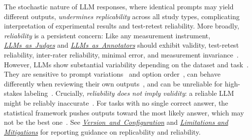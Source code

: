 \documentclass[smallextended]{svjour3}
\newcommand{\annotators}{\hyperref[sec:llms-as-annotators]{\mbox{\emph{LLMs as Annotators}}}\xspace}
\newcommand{\judges}{\hyperref[sec:llms-as-judges]{\mbox{\emph{LLMs as Judges}}}\xspace}
\newcommand{\annotators}{\href{/study-types/annotators/}{\emph{LLMs as Annotators}}\xspace}
\newcommand{\judges}{\href{/study-types/judges/}{\emph{LLMs as Judges}}\xspace}
\newcommand{\modelversion}{\hyperref[sec:report-model-version-configuration-and-customizations]{\mbox{\emph{Version and Configuration}}}\xspace}
\newcommand{\limitationsmitigations}{\hyperref[sec:report-limitations-and-mitigations]{\emph{Limitations and Mitigations}}\xspace}
\newcommand{\modelversion}{\href{/guidelines/model-version/}{\emph{Version and Configuration}}\xspace}
\newcommand{\limitationsmitigations}{\href{/guidelines/limitations/}{\emph{Limitations and Mitigations}}\xspace}
\begin{document}
The stochastic nature of LLM responses, where identical prompts may yield different outputs, \emph{undermines replicability} across all study types, complicating interpretation of experimental results and test-retest reliability. More broadly, \emph{reliability} is a persistent concern: Like any measurement instrument, \judges and \annotators should exhibit validity, test-retest reliability, inter-rater reliability, minimal error, and measurement invariance~\cite{DBLP:books/sp/24/RalphKAA24}. However, LLMs show substantial variability depending on the dataset and task~\cite{DBLP:journals/corr/abs-2306-00176, DBLP:journals/corr/abs-2406-18403}. They are sensitive to prompt variations~\cite{DBLP:journals/corr/abs-2304-11085} and option order~\cite{DBLP:conf/naacl/PezeshkpourH24}, can behave differently when reviewing their own outputs~\cite{DBLP:conf/nips/PanicksseryBF24}, and can be unreliable for high-stakes labeling~\cite{DBLP:conf/chi/Wang0RMM24}. Crucially, \emph{reliability does not imply validity}: a reliable LLM might be reliably inaccurate~\cite{DBLP:conf/coling/ZhouC024}. For tasks with no single correct answer, the statistical framework pushes outputs toward the most likely answer, which may not be the best one~\cite{DBLP:journals/corr/abs-2510-01171, DBLP:journals/corr/abs-2310-06452}. See \modelversion and \limitationsmitigations for reporting guidance on replicability and reliability.
\end{document}
